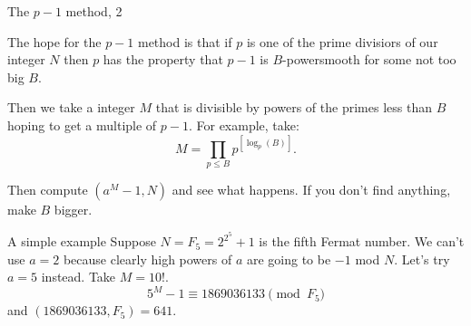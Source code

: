 \documentclass{beamer}
\begin{document}
\begin{frame}{The $p-1$ method, 2}
	
	The hope for the $p-1$ method is that if $p$ is one  of the prime divisiors of our integer $N$ then $p$ has the property that $p-1$ is $B$-powersmooth
	for some not too big $B$. 

	\bigskip\noindent
	Then we take a integer $M$ that is divisible by powers of the primes less than $B$ hoping to get a multiple of $p-1$. 
	For example, take:
	$$
	M=\prod_{p\le B} p^{[\log_{p}(B)]}.
	$$

	\bigskip\noindent
	Then compute $(a^{M}-1,N)$ and see what happens.  If you don't find anything, make $B$ bigger.

\end{frame}
\begin{frame}{A simple example}
	Suppose $N=F_{5}=2^{2^5}+1$ is the fifth Fermat number.  We can't use $a=2$ because clearly high powers of $a$ are going to be 
	$-1$ mod $N$. Let's try $a=5$ instead. Take $M=10!$.  
	$$
	5^M-1 \equiv 1869036133\pmod{F_{5}}
	$$
	and $(1869036133,F_{5})=641$. 
\end{frame}
\end{document}
